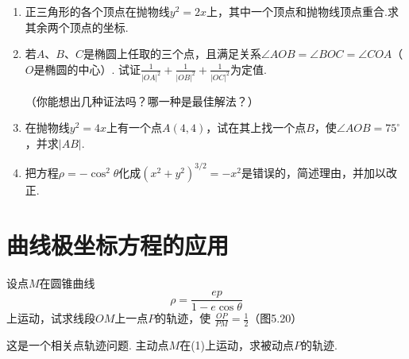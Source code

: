 \begin{enumerate}
\begin{multicols}{2}
\begin{enumerate}[(1)]
    $(a>0)$
\end{enumerate}
\end{multicols}

\item 正三角形的各个顶点在抛物线$y^2=2x$上，其中一个顶点和抛物线顶点重合.求其余两个顶点的坐标.
\item 若$A$、$B$、$C$是椭圆上任取的三个点，且满足关系$\angle AOB=\angle BOC=\angle COA$（$O$是椭圆的中心）. 试证$\frac{1}{|OA|^2}+\frac{1}{|OB|^2}+\frac{1}{|OC|^2}$为定值.

（你能想出几种证法吗？哪一种是最佳解法？）
\item 在抛物线$y^2=4x$上有一个点$A(4,4)$，试在其上找一个点$B$，使$\angle AOB=75^{\circ}$，并求$|AB|$.
\item 把方程$\rho=-\cos^2\theta$化成$(x^2+y^2)^{3/2}=-x^2$是错误的，简述理由，并加以改正.

\end{enumerate}

\section{曲线极坐标方程的应用}

\noindent
\begin{minipage}{.55\textwidth}
\begin{example}
    设点$M$在圆锥曲线
\begin{equation}
    \rho=\frac{ep}{1-e\cos\theta} \tag{1}
\end{equation}
上运动，试求线段$OM$上一点$P$的轨迹，使
$\frac{OP}{PM}=\frac{1}{2}$（图5.20）
\end{example}

\begin{analyze}
    这是一个相关点轨迹问题. 主动点$M$在(1)上运动，求被动点$P$的轨迹.
\end{analyze}
\end{minipage}
\hfill
\begin{minipage}{.42\textwidth}
\centering
{}
\end{minipage}


